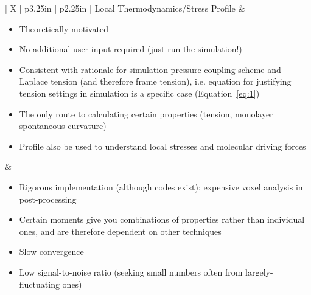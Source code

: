 \documentclass[9pt,bestpractices,pubversion]{livecoms}
\begin{document}
\begin{table}[!htp]
\begin{tabularx}{\linewidth}{| X | p{3.25in} | p{2.25in} |}
Local Thermodynamics/Stress Profile & \begin{minipage}[t]{\linewidth} \begin{itemize}[nosep,after=\strut] \item Theoretically motivated \item No additional user input required (just run the simulation!) \item Consistent with rationale for simulation pressure coupling scheme and Laplace tension (and therefore frame tension), i.e. equation for justifying tension settings in simulation is a specific case (Equation~\ref{eq:1}) \item The only route to calculating certain properties (tension, monolayer spontaneous curvature) \item Profile also be used to understand local stresses and molecular driving forces \end{itemize} \end{minipage} & \begin{minipage}[t]{\linewidth} \begin{itemize}[nosep,after=\strut] \item Rigorous implementation (although codes exist); expensive voxel analysis in post-processing \item Certain moments give you combinations of properties rather than individual ones, and are therefore dependent on other techniques \item Slow convergence \item Low signal-to-noise ratio (seeking small numbers often from largely-fluctuating ones) \end{itemize} \end{minipage} \\
\hline

\end{tabularx}
\end{table}
\end{document}
